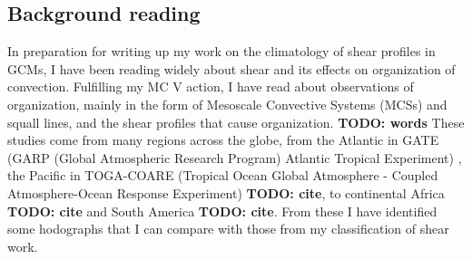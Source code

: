 \documentclass[11pt,a4paper]{article}
\newcommand\todo[1]{\textbf{TODO: #1}}
\begin{document}
\subsection{Background reading}
\label{sec:Background reading}

In preparation for writing up my work on the climatology of shear profiles in GCMs, I have been reading widely about shear and its effects on organization of convection. Fulfilling my MC V action, I have read about observations of organization, mainly in the form of Mesoscale Convective Systems (MCSs) and squall lines, and the shear profiles that cause organization. \todo{words} These studies come from many regions across the globe, from the Atlantic in GATE (GARP (Global Atmospheric Research Program) Atlantic Tropical Experiment) \parencite{houze1977structure, zipser1977}, the Pacific in TOGA-COARE (Tropical Ocean Global Atmosphere - Coupled Atmosphere-Ocean Response Experiment) \todo{cite}, to continental Africa \todo{cite} and South America \todo{cite}. From these I have identified some hodographs that I can compare with those from my classification of shear work. 



\end{document}
